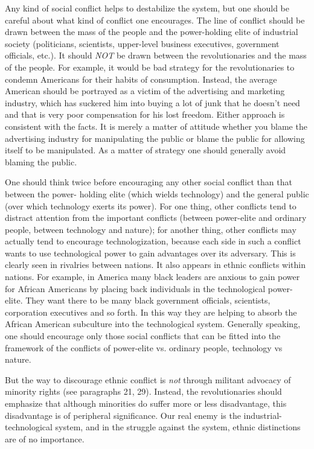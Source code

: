  Any kind of social conflict helps to destabilize the system, but one should be careful about what kind of conflict one encourages. The line of conflict should be drawn between the mass of the people and the power-holding elite of industrial society (politicians, scientists, upper-level business executives, government officials, etc.). It should {\em NOT} be drawn between the revolutionaries and the mass of the people. For example, it would be bad strategy for the revolutionaries to condemn Americans for their habits of consumption. Instead, the average American should be portrayed as a victim of the advertising and marketing industry, which has suckered him into buying a lot of junk that he doesn’t need and that is very poor compensation for his lost freedom. Either approach is consistent with the facts. It is merely a matter of attitude whether you blame the advertising industry for manipulating the public or blame the public for allowing itself to be manipulated. As a matter of strategy one should generally avoid blaming the public.

 One should think twice before encouraging any other social conflict than that between the power- holding elite (which wields technology) and the general public (over which technology exerts its power). For one thing, other conflicts tend to distract attention from the important conflicts (between power-elite and ordinary people, between technology and nature); for another thing, other conflicts may actually tend to encourage technologization, because each side in such a conflict wants to use technological power to gain advantages over its adversary. This is clearly seen in rivalries between nations. It also appears in ethnic conflicts within nations. For example, in America many black leaders are anxious to gain power for African Americans by placing back individuals in the technological power-elite. They want there to be many black government officials, scientists, corporation executives and so forth. In this way they are helping to absorb the African American subculture into the technological system. Generally speaking, one should encourage only those social conflicts that can be fitted into the framework of the conflicts of power-elite vs. ordinary people, technology vs nature.

 But the way to discourage ethnic conflict is {\em not} through militant advocacy of minority rights (see paragraphs 21, 29). Instead, the revolutionaries should emphasize that although minorities do suffer more or less disadvantage, this disadvantage is of peripheral significance. Our real enemy is the industrial- technological system, and in the struggle against the system, ethnic distinctions are of no importance.

